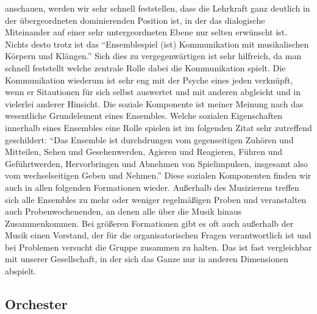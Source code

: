 anschauen, werden wir sehr schnell feststellen, dass die Lehrkraft ganz deutlich
in der übergeordneten dominierenden Position ist, in der das dialogische
Miteinander auf einer sehr untergeordneten Ebene nur selten erwünscht ist. Nichts
desto trotz ist das \enquote{Ensemblespiel (ist) Kommunikation mit musikalischen
Körpern und Klängen.} \autocite[62]{doerne:umfassend_musizieren} Sich dies zu
vergegenwärtigen ist sehr hilfreich, da man schnell feststellt welche zentrale
Rolle dabei die Kommunikation spielt. Die Kommunikation wiederum ist sehr eng
mit der Psyche eines jeden verknüpft, wenn er Sitautionen für sich selbst
auswertet und mit anderen abgleicht und in vielerlei anderer Hinsicht. Die
soziale Komponente ist meiner Meinung nach das wesentliche Grundelement eines
Ensembles. Welche sozialen Eigenschaften innerhalb eines Ensembles eine Rolle
spielen ist im folgenden Zitat sehr zutreffend geschildert: \enquote{Das
Ensemble ist durchdrungen vom gegenseitigen Zuhören und Mitteilen, Sehen und
Gesehenwerden, Agieren und Reagieren, Führen und Geführtwerden, Hervorbringen
und Abnehmen von Spielimpulsen, insgesamt also vom wechselseitigen Geben und
Nehmen.} \autocite[62]{doerne:umfassend_musizieren} Diese sozialen Komponenten
finden wir auch in allen folgenden Formationen wieder. Außerhalb des Musizierens
treffen sich alle Ensembles zu mehr oder weniger regelmäßigen Proben und
veranstalten auch Probenwochenenden, an denen alle über die Musik hinaus
Zusammenkommen. Bei größeren Formationen gibt es oft auch außerhalb der Musik
einen Vorstand, der für die organisatorischen Fragen verantwortlich ist und bei
Problemen versucht die Gruppe zusammen zu halten. Das ist fast vergleichbar mit
unserer Gesellschaft, in der sich das Ganze nur in anderen Dimensionen abspielt.



\subsection{Orchester} 

